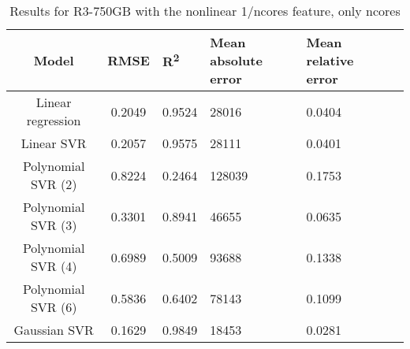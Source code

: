 \begin{table}[H]
\centering
\begin{adjustbox}{center}
\begin{tabular}{c | c M{1.2cm} M{2.5cm} M{2.5cm} M{1.8cm}}
Model & RMSE & R\textsuperscript{2} & Mean absolute error & Mean relative error \tabularnewline
\hline
Linear regression & 0.2049 & 0.9524 &  28016 & 0.0404 \\
Linear SVR & 0.2057 & 0.9575 &  28111 & 0.0401 \\
Polynomial SVR (2) & 0.8224 & 0.2464 & 128039 & 0.1753 \\
Polynomial SVR (3) & 0.3301 & 0.8941 &  46655 & 0.0635 \\
Polynomial SVR (4) & 0.6989 & 0.5009 &  93688 & 0.1338 \\
Polynomial SVR (6) & 0.5836 & 0.6402 &  78143 & 0.1099 \\
Gaussian SVR & 0.1629 & 0.9849 &  18453 & 0.0281 \\
\end{tabular}
\end{adjustbox}
\\
\caption{Results for R3-750GB with the nonlinear 1/ncores feature, only ncores}
\label{tab:all_nonlinear_R3_750}
\end{table}
